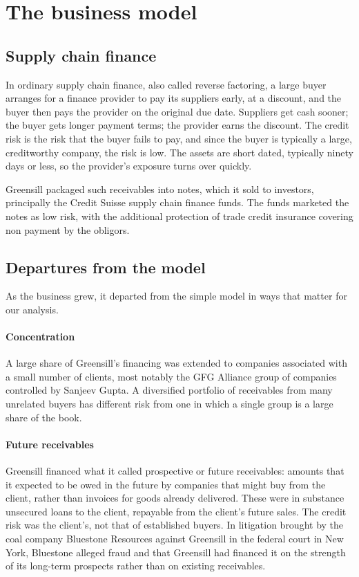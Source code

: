 \section{The business model}

\subsection{Supply chain finance}

In ordinary supply chain finance, also called reverse factoring, a large buyer arranges for a finance provider to pay its suppliers early, at a discount, and the buyer then pays the provider on the original due date. Suppliers get cash sooner; the buyer gets longer payment terms; the provider earns the discount. The credit risk is the risk that the buyer fails to pay, and since the buyer is typically a large, creditworthy company, the risk is low. The assets are short dated, typically ninety days or less, so the provider's exposure turns over quickly.

Greensill packaged such receivables into notes, which it sold to investors, principally the Credit Suisse supply chain finance funds. The funds marketed the notes as low risk, with the additional protection of trade credit insurance covering non payment by the obligors.

\subsection{Departures from the model}

As the business grew, it departed from the simple model in ways that matter for our analysis.

\paragraph{Concentration} A large share of Greensill's financing was extended to companies associated with a small number of clients, most notably the GFG Alliance group of companies controlled by Sanjeev Gupta. A diversified portfolio of receivables from many unrelated buyers has different risk from one in which a single group is a large share of the book.

\paragraph{Future receivables} Greensill financed what it called prospective or future receivables: amounts that it expected to be owed in the future by companies that might buy from the client, rather than invoices for goods already delivered. These were in substance unsecured loans to the client, repayable from the client's future sales. The credit risk was the client's, not that of established buyers. In litigation brought by the coal company Bluestone Resources against Greensill in the federal court in New York, Bluestone alleged fraud and that Greensill had financed it on the strength of its long-term prospects rather than on existing receivables.

